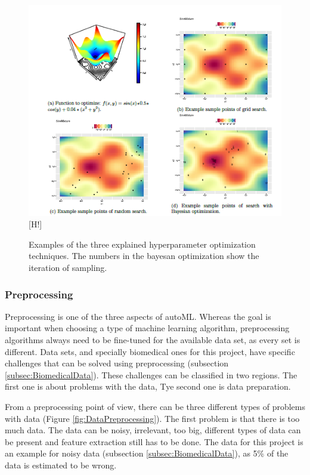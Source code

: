 \documentclass[10pt,a4paper]{article}
\begin{document}
	\begin{figure}
		\label{fig:HyperparameterOptimization}
		\includegraphics[scale=0.8]{HyperparameterOptimization.png}[H!]
		\caption{Examples of the three explained hyperparameter optimization techniques. The numbers in the bayesan optimization show the iteration of sampling.\cite{Gijsbers2017Thesis}}
	\end{figure}
	
	\subsubsection{Preprocessing}
	\label{subsubsec:Preprocessing}
	
 	Preprocessing is one of the three aspects of autoML. Whereas the goal is important when choosing a type of machine learning algorithm, preprocessing algorithms always need to be fine-tuned for the available data set, as every set is different. Data sets, and specially biomedical ones for this project, have specific challenges that can be solved using preprocessing (subsection \ref{subsec:BiomedicalData}). These challenges can be classified in two regions. The first one is about problems with the data, Tye second one is data preparation.\cite{famili1997data}
 	
 	From a preprocessing point of view, there can be three different types of problems with data (Figure \ref{fig:DataPreprocessing}). The first problem is that there is too much data. The data can be noisy, irrelevant, too big, different types of data can be present and feature extraction still has to be done. The data for this project is an example for noisy data (subsection \ref{subsec:BiomedicalData}), as 5\% of the data is estimated to be wrong.
 	
\end{document}
